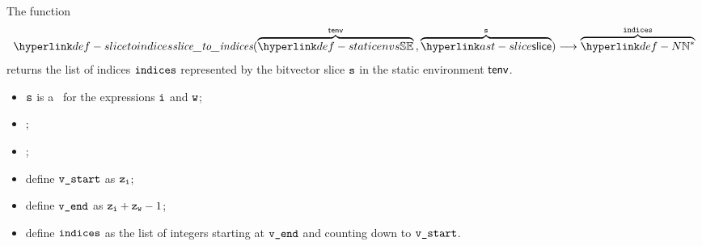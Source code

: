 \FormallyParagraph
\begin{mathpar}
\end{mathpar}

\hypertarget{def-slicetoindices}{}
The function
\[
\slicetoindices(\overname{\staticenvs}{\tenv} \aslsep \overname{\slice}{\vs}) \aslto \overname{\N^*}{\indices}
\]
returns the list of indices $\indices$ represented by the bitvector slice $\vs$ in the static environment $\tenv$.

\ProseParagraph
\AllApply
\begin{itemize}
  \item $\vs$ is a \lengthslice\ for the expressions $\vi$ and $\vw$;
  \item {};
  \item {};
  \item define $\vstart$ as $\vz_\vi$;
  \item define $\vend$ as $\vz_\vi + \vz_\vw - 1$;
  \item define $\indices$ as the list of integers starting at $\vend$ and counting down to $\vstart$.
\end{itemize}

\FormallyParagraph
\begin{mathpar}
\end{mathpar}
